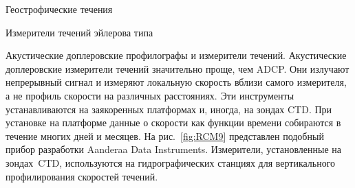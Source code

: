 \begin{chapter}{Геострофические течения}
\begin{section}{Измерители течений эйлерова типа}
\begin{paragraph}{Акустические доплеровские профилографы и измерители течений.}
Акустические доплеровские измерители течений значительно проще, чем ADCP.
Они излучают непрерывный сигнал и измеряют локальную скорость
вблизи самого измерителя, а не профиль скорости на различных
расстояниях. Эти инструменты устанавливаются на заякоренных платформах и, 
иногда, на зондах CTD. При установке на платформе данные о скорости как функции 
времени собираются в течение многих дней и месяцев. 
На рис.~\ref{fig:RCM9} представлен подобный прибор разработки 
Aanderaa Data Instruments. 
Измерители, установленные на зондах~CTD, используются 
на гидрографических станциях для вертикального профилирования скоростей течений.
%


\end{paragraph}
\end{section}
\end{chapter}
